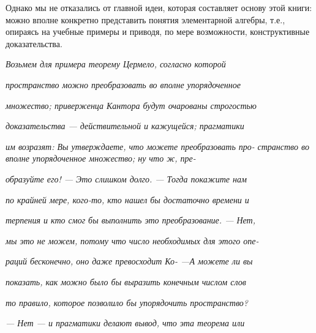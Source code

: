\documentclass{mai_book}
\begin{document}
{{   Однако мы не отказались от главной идеи, которая составляет основу этой книги: можно вполне конкретно представить понятия элементарной алгебры, т.е., опираясь на учебные примеры и приводя, по мере возможности, конструктивные доказательства.
   
\hspace{0.8in} \small  \textit {Возьмем для примера теорему Цермело, согласно которой}

\hspace{0.6in} \small  \textit {пространство можно преобразовать во вполне упорядоченное}

\hspace{0.6in} \small  \textit {множество; приверженца Кантора будут очарованы строгостью}

\hspace{0.6in} \small  \textit {доказательства — действительной и кажущейся; прагматики}

\hspace{0.6in} \small  \textit {им возразят: Вы утверждаете, что можете преобразовать про-}
\newpage
{}
\hspace{0.6in} \small \textit {странство во вполне упорядоченное множество; ну что ж, пре-}

\hspace{0.6in} \small  \textit {образуйте его! — Это слишком долго. — Тогда покажите нам }

\hspace{0.6in} \small  \textit {по крайней мере, кого-то, кто нашел бы достаточно времени и }

\hspace{0.6in} \small  \textit {терпения и кто смог бы выполнить это преобразование. — Нет, }

\hspace{0.6in} \small  \textit {мы это не можем, потому что число необходимых для этого опе-}

\hspace{0.6in} \small  \textit {раций бесконечно, оно даже превосходит Ко- —А можете ли вы }

\hspace{0.6in} \small  \textit {показать, как можно было бы выразить конечным числом слов }

\hspace{0.6in} \small  \textit {то правило, которое позволило бы упорядочить пространство?} 

\hspace{0.6in} \small  \textit {— Нет — и прагматики делают вывод, что эта теорема или }

}}
\end{document}
